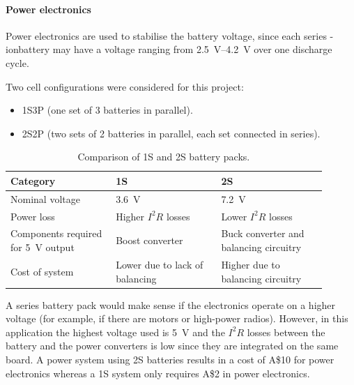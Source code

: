 \documentclass[a4paper,11pt]{article}
\newcommand{\liion}{\ce{Li}-ion}
\newcommand{\aud}{A\$}
\begin{document}

\paragraph{Power electronics} Power electronics are used to stabilise the battery voltage, since each series \liion battery may have a voltage ranging from \SIrange{2.5}{4.2}{\volt} over one discharge cycle.

Two cell configurations were considered for this project:
\begin{itemize}
  \item 1S3P (one set of 3 batteries in parallel).
  \item 2S2P (two sets of 2 batteries in parallel, each set connected in series).
\end{itemize}

\begin{table}[H]
  \centering
  \begin{tabular}{|p{0.3\linewidth}|p{0.3\linewidth}|p{0.3\linewidth}|}
    \hline
    \textbf{Category}                            & \textbf{1S}                    & \textbf{2S}                            \\
    \hline
    Nominal voltage                              & \SI{3.6}{\volt}                & \SI{7.2}{\volt}                        \\
    Power loss                                   & Higher $I^2R$ losses           & Lower $I^2R$ losses                    \\
    Components required for \SI{5}{\volt} output & Boost converter                & Buck converter and balancing circuitry \\
    Cost of system                               & Lower due to lack of balancing & Higher due to balancing circuitry      \\
    \hline
  \end{tabular}
  \caption{Comparison of 1S and 2S battery packs.}
  \label{tabl:battery-1s2s-comparison}
\end{table}

A series battery pack would make sense if the electronics operate on a higher voltage (for example, if there are motors or high-power radios). However, in this application the highest voltage used is \SI{5}{\volt} and the $I^2R$ losses between the battery and the power converters is low since they are integrated on the same board. A power system using 2S batteries results in a cost of \aud 10 for power electronics whereas a 1S system only requires \aud 2 in power electronics.
\end{document}

